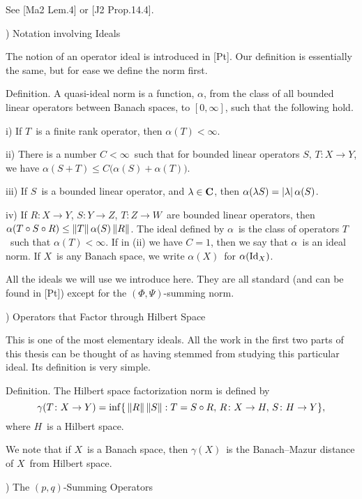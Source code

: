 \Proof See [Ma2 Lem.4] or [J2 Prop.14.4].
\endproof
 
\vfill
\eject
 
) Notation involving Ideals
 
The notion of an operator ideal is introduced in [Pt].
Our definition is essentially the same, but for ease we define the
norm first.
 
\proclaim Definition. A {\dt quasi-ideal norm} is a function, $\alpha$,
from
the class of all bounded linear operators between Banach spaces,
to
$[0,\infty]$, such that the following hold.
\item{i)} If $T$\ is a finite rank operator, then $\alpha(T)<\infty$.
\item{ii)} There is a number $C<\infty$\ such that for bounded linear
operators $S,\,T\colon X\to Y$, we have $\alpha(S+T)\le C\big(
\alpha(S)+\alpha(T)\big)$.
\item{iii)} If $S$\ is a bounded linear operator, and $\lambda\in{\bf C}$,
then
$\alpha(\lambda S)=\left|\lambda\right|\alpha(S)$.
\item{iv)} If $R\colon X\to Y$, $S\colon Y\to Z$, $T\colon Z\to W$\
are bounded
linear operators, then $\alpha(T\circ S\circ R)\le \left\|
T\right\|\alpha(S)\left\| R\right\|$.
\moreproclaim
The {\dt ideal} defined by $\alpha$\ is the class of operators $T$\
such that
$\alpha(T)<\infty$. If in (ii) we have $C=1$, then we say that $\alpha$\
is an
{\dt ideal norm}. If $X$\ is any Banach space, we write $\alpha(X)$\
for
$\alpha(\mathord{\rm Id}_X)$.
 
All the ideals we will use we introduce here. They are all standard
(and can be
found in [Pt]) except for the $(\Phi,\Psi)$-summing norm.
 
\beginsection 3.1) Operators that Factor through Hilbert Space
 
This is one of the most elementary ideals. All the work in the first
two parts
of this thesis can be thought of as having stemmed from studying
this
particular ideal. Its definition is very simple.
 
\proclaim Definition. The {\dt Hilbert space factorization norm}
is defined by
$$ \gamma(T\colon X\to Y) = \inf\{\,\left\| R \right\| \left\| S \right\|:T=S\circ R,\,
   R\colon X\to H,\,S\colon H\to Y \},$$
where $H$\ is a Hilbert space.
 
We note that if $X$\ is a Banach space, then $\gamma(X)$\ is the
Banach--Mazur
distance of $X$\ from Hilbert space.
 
\beginsection 3.2) The $(p,q)$-Summing Operators
 
